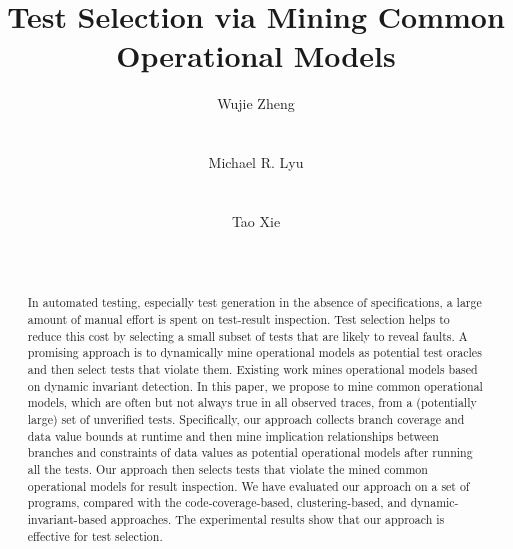 \documentclass{sig-alternate}
\begin{document}
%

\title{ Test Selection via Mining Common Operational Models }

\author{
\alignauthor
Wujie Zheng\\
       \\
       \\
\alignauthor Michael R. Lyu\\
       \\
       \\
\alignauthor Tao Xie\\
       \\
       \\
}
\maketitle

\begin{abstract}
In automated testing, especially test generation in the absence of
specifications, a large amount of manual effort is spent on
test-result inspection. Test selection helps to reduce this cost by
selecting a small subset of tests that are likely to reveal faults.
A promising approach is to dynamically mine operational models as
potential test oracles and then select tests that violate them.
Existing work mines operational models based on dynamic invariant
detection. In this paper, we propose to mine common operational
models, which are often but not always true in all observed traces,
from a (potentially large) set of unverified tests. Specifically,
our approach collects branch coverage and data value bounds at
runtime and then mine implication relationships between branches and
constraints of data values as potential operational models after
running all the tests. Our approach then selects tests that violate
the mined common operational models for result inspection. We have
evaluated our approach on a set of programs, compared with the
code-coverage-based, clustering-based, and dynamic-invariant-based
approaches. The experimental results show that our approach is
effective for test selection.


\end{abstract}
\end{document}

